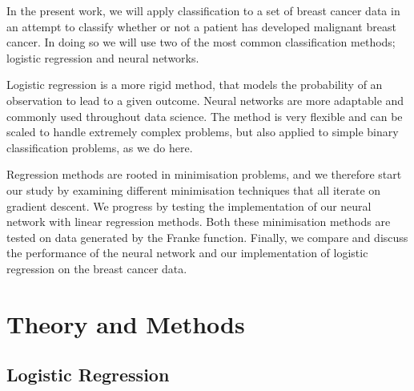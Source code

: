 \documentclass[a4paper,
amsfonts,
amssymb,
amsmath,
reprint,
showkeys,
nofootinbib,
twoside]{revtex4-2}
\begin{document}
In the present work, we will apply classification to a set of breast cancer data in an attempt to classify whether or not a patient has developed malignant breast cancer. In doing so we will use two of the most common classification methods; logistic regression and neural networks.

Logistic regression is a more rigid method, that models the probability of an observation to lead to a given outcome. Neural networks are more adaptable and commonly used throughout data science. The method is very flexible and can be scaled to handle extremely complex problems, but also applied to simple binary classification problems, as we do here.

Regression methods are rooted in minimisation problems, and we therefore start our study by examining different minimisation techniques that all iterate on gradient descent. We progress by testing the implementation of our neural network with linear regression methods. Both these minimisation methods are tested on data generated by the Franke function. Finally, we compare and discuss the performance of the neural network and our implementation of logistic regression on the breast cancer data.

\section{Theory and Methods}

\subsection{Logistic Regression}
\end{document}
